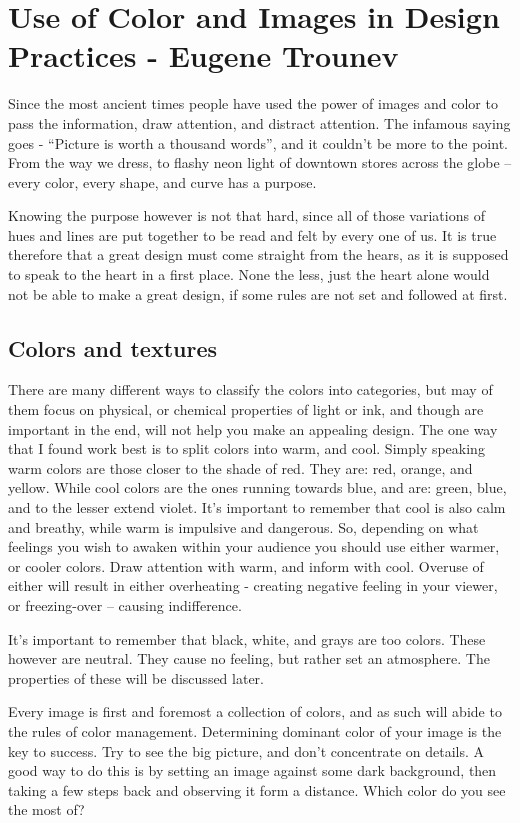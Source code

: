 \chapter{Use of Color and Images in Design Practices - Eugene Trounev}

Since the most ancient times people have used the power of images and color to
pass the information, draw attention, and distract attention. The infamous
saying goes - “Picture is worth a thousand words”, and it couldn't be more to
the point. From the way we dress, to flashy neon light of downtown stores across
the globe – every color, every shape, and curve has a purpose.

Knowing the purpose however is not that hard, since all of those variations of
hues and lines are put together to be read and felt by every one of us. It is
true therefore that a great design must come straight from the hears, as it is
supposed to speak to the heart in a first place. None the less, just the heart
alone would not be able to make a great design, if some rules are not set and
followed at first.

\section*{Colors and textures}

There are many different ways to classify the colors into categories, but may of
them focus on physical, or chemical properties of light or ink, and though are
important in the end, will not help you make an appealing design. The one way
that I found work best is to split colors into warm, and cool. Simply speaking
warm colors are those closer to the shade of red. They are: red, orange, and
yellow. While cool colors are the ones running towards blue, and are: green,
blue, and to the lesser extend violet. It's important to remember that cool is
also calm and breathy, while warm is impulsive and dangerous. So, depending on
what feelings you wish to awaken within your audience you should use either
warmer, or cooler colors. Draw attention with warm, and inform with cool.
Overuse of either will result in either overheating - creating negative feeling
in your viewer, or freezing-over – causing indifference.

It's important to remember that black, white, and grays are too colors. These
however are neutral. They cause no feeling, but rather set an atmosphere. The
properties of these will be discussed later.

Every image is first and foremost a collection of colors, and as such will abide
to the rules of color management. Determining dominant color of your image is
the key to success. Try to see the big picture, and don't concentrate on
details. A good way to do this is by setting an image against some dark
background, then taking a few steps back and observing it form a distance. Which
color do you see the most of?

